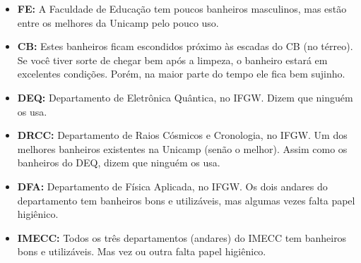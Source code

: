 \begin{itemize}
    \item  \textbf{FE:} A Faculdade de Educação tem poucos banheiros masculinos,
        mas estão entre os melhores da Unicamp pelo pouco uso.

    \item  \textbf{CB:} Estes banheiros ficam escondidos próximo às escadas do
        CB (no térreo). Se você tiver sorte de chegar bem após a limpeza, o
        banheiro estará em excelentes condições. Porém, na maior parte do tempo
        ele fica bem sujinho.

    \item  \textbf{DEQ:} Departamento de Eletrônica Quântica, no IFGW. Dizem que
        ninguém os usa.

    \item  \textbf{DRCC:} Departamento de Raios Cósmicos e Cronologia, no IFGW.
        Um dos melhores banheiros existentes na Unicamp (senão o melhor). Assim
        como os banheiros do DEQ, dizem que ninguém os usa.

    \item  \textbf{DFA:} Departamento de Física Aplicada, no IFGW. Os dois
        andares do departamento tem banheiros bons e utilizáveis, mas algumas
        vezes falta papel higiênico.

    \item  \textbf{IMECC:} Todos os três departamentos (andares) do IMECC tem
        banheiros bons e utilizáveis. Mas vez ou outra falta papel higiênico.
\end{itemize}
